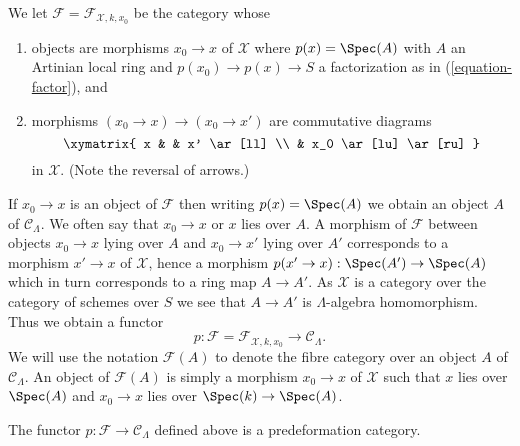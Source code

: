 \medskip\noindent
We let $\mathcal{F} = \mathcal{F}_{\mathcal{X}, k, x_0}$ be the
category whose
\begin{enumerate}
\item objects are morphisms $x_0 \to x$ of $\mathcal{X}$ where
$p(x) = \Spec(A)$ with $A$ an Artinian local ring and
$p(x_0) \to p(x) \to S$ a factorization as in (\ref{equation-factor}), and
\item morphisms $(x_0 \to x) \to (x_0 \to x')$ are commutative
diagrams
$$
\xymatrix{
x & & x' \ar[ll] \\
& x_0 \ar[lu] \ar[ru]
}
$$
in $\mathcal{X}$. (Note the reversal of arrows.)
\end{enumerate}
If $x_0 \to x$ is an object of $\mathcal{F}$ then writing $p(x) = \Spec(A)$
we obtain an object $A$ of $\mathcal{C}_\Lambda$. We often say that
$x_0 \to x$ or $x$ lies over $A$. A morphism of $\mathcal{F}$ between objects
$x_0 \to x$ lying over $A$ and $x_0 \to x'$ lying over $A'$
corresponds to a morphism $x' \to x$ of $\mathcal{X}$, hence a morphism
$p(x' \to x) : \Spec(A') \to \Spec(A)$ which in turn corresponds to a
ring map $A \to A'$. As $\mathcal{X}$ is a category
over the category of schemes over $S$ we see that $A \to A'$ is
$\Lambda$-algebra homomorphism. Thus we obtain a functor
\begin{equation}
\label{equation-predeformation-category}
p : \mathcal{F} = \mathcal{F}_{\mathcal{X}, k, x_0}
\longrightarrow
\mathcal{C}_\Lambda.
\end{equation}
We will use the notation $\mathcal{F}(A)$ to denote the fibre category
over an object $A$ of $\mathcal{C}_\Lambda$. An object of $\mathcal{F}(A)$
is simply a morphism $x_0 \to x$ of $\mathcal{X}$ such that
$x$ lies over $\Spec(A)$ and $x_0 \to x$ lies over $\Spec(k) \to \Spec(A)$.

\begin{lemma}
\label{lemma-predeformation-category}
The functor $p : \mathcal{F} \to \mathcal{C}_\Lambda$ defined above
is a predeformation category.
\end{lemma}

